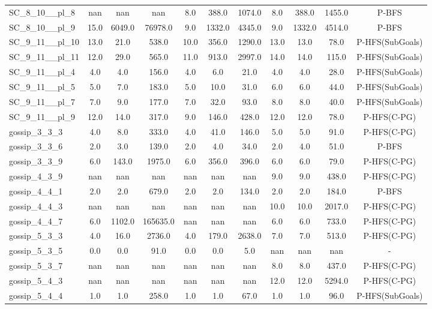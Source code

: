 \begin{table}[!ht]
\begin{tabular}{l|ccc|ccc|cccc}
SC\_8\_10\_\_pl\_8 & nan & nan & nan & 8.0 & 388.0 & 1074.0 & 8.0 & 388.0 & 1455.0 & P-BFS \\
SC\_8\_10\_\_pl\_9 & 15.0 & 6049.0 & 76978.0 & 9.0 & 1332.0 & 4345.0 & 9.0 & 1332.0 & 4514.0 & P-BFS \\
SC\_9\_11\_\_pl\_10 & 13.0 & 21.0 & 538.0 & 10.0 & 356.0 & 1290.0 & 13.0 & 13.0 & 78.0 & P-HFS(SubGoals) \\
SC\_9\_11\_\_pl\_11 & 12.0 & 29.0 & 565.0 & 11.0 & 913.0 & 2997.0 & 14.0 & 14.0 & 115.0 & P-HFS(SubGoals) \\
SC\_9\_11\_\_pl\_4 & 4.0 & 4.0 & 156.0 & 4.0 & 6.0 & 21.0 & 4.0 & 4.0 & 28.0 & P-HFS(SubGoals) \\
SC\_9\_11\_\_pl\_5 & 5.0 & 7.0 & 183.0 & 5.0 & 10.0 & 31.0 & 6.0 & 6.0 & 44.0 & P-HFS(SubGoals) \\
SC\_9\_11\_\_pl\_7 & 7.0 & 9.0 & 177.0 & 7.0 & 32.0 & 93.0 & 8.0 & 8.0 & 40.0 & P-HFS(SubGoals) \\
SC\_9\_11\_\_pl\_9 & 12.0 & 14.0 & 317.0 & 9.0 & 146.0 & 428.0 & 12.0 & 12.0 & 78.0 & P-HFS(C-PG) \\
gossip\_3\_3\_3 & 4.0 & 8.0 & 333.0 & 4.0 & 41.0 & 146.0 & 5.0 & 5.0 & 91.0 & P-HFS(C-PG) \\
gossip\_3\_3\_6 & 2.0 & 3.0 & 139.0 & 2.0 & 4.0 & 34.0 & 2.0 & 4.0 & 51.0 & P-BFS \\
gossip\_3\_3\_9 & 6.0 & 143.0 & 1975.0 & 6.0 & 356.0 & 396.0 & 6.0 & 6.0 & 79.0 & P-HFS(C-PG) \\
gossip\_4\_3\_9 & nan & nan & nan & nan & nan & nan & 9.0 & 9.0 & 438.0 & P-HFS(C-PG) \\
gossip\_4\_4\_1 & 2.0 & 2.0 & 679.0 & 2.0 & 2.0 & 134.0 & 2.0 & 2.0 & 184.0 & P-BFS \\
gossip\_4\_4\_3 & nan & nan & nan & nan & nan & nan & 10.0 & 10.0 & 2017.0 & P-HFS(C-PG) \\
gossip\_4\_4\_7 & 6.0 & 1102.0 & 165635.0 & nan & nan & nan & 6.0 & 6.0 & 733.0 & P-HFS(C-PG) \\
gossip\_5\_3\_3 & 4.0 & 16.0 & 2736.0 & 4.0 & 179.0 & 2638.0 & 7.0 & 7.0 & 513.0 & P-HFS(C-PG) \\
gossip\_5\_3\_5 & 0.0 & 0.0 & 91.0 & 0.0 & 0.0 & 5.0 & nan & nan & nan & - \\
gossip\_5\_3\_7 & nan & nan & nan & nan & nan & nan & 8.0 & 8.0 & 437.0 & P-HFS(C-PG) \\
gossip\_5\_4\_3 & nan & nan & nan & nan & nan & nan & 12.0 & 12.0 & 5294.0 & P-HFS(C-PG) \\
gossip\_5\_4\_4 & 1.0 & 1.0 & 258.0 & 1.0 & 1.0 & 67.0 & 1.0 & 1.0 & 96.0 & P-HFS(SubGoals) \\

\end{tabular}
\end{table}
